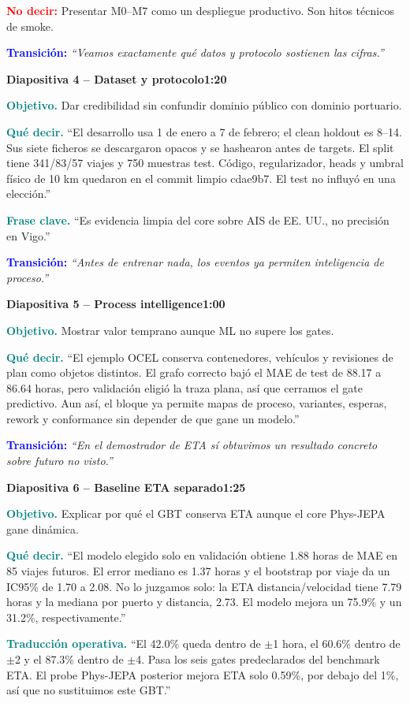 \documentclass[11pt,a4paper]{article}
\newcommand{\slidehead}[3]{%
  \par\vspace{7pt}\noindent
  \colorbox{Ink}{\parbox{\dimexpr\linewidth-2\fboxsep\relax}{%
    \color{white}\textbf{Diapositiva #1 -- #2}\hfill\color{Teal!45}\textbf{#3}}}%
  \par\vspace{5pt}}
\newcommand{\cue}[1]{\textcolor{Teal}{\textbf{#1}}}
\newcommand{\avoid}[1]{\textcolor{Red}{\textbf{No decir:}} #1}
\newcommand{\transition}[1]{\textcolor{Blue}{\textbf{Transición:}} \emph{``#1''}}
\begin{document}
\avoid{Presentar M0--M7 como un despliegue productivo. Son hitos técnicos de smoke.}

\transition{Veamos exactamente qué datos y protocolo sostienen las cifras.}

\slidehead{4}{Dataset y protocolo}{1:20}
\cue{Objetivo.} Dar credibilidad sin confundir dominio público con dominio portuario.

\cue{Qué decir.} ``El desarrollo usa 1 de enero a 7 de febrero; el clean holdout es 8--14.
Sus siete ficheros se descargaron opacos y se hashearon antes de targets. El split tiene
341/83/57 viajes y 750
muestras test. Código, regularizador, heads y umbral físico de 10 km quedaron en el commit
limpio cdae9b7. El test no influyó en una elección.''

\cue{Frase clave.} ``Es evidencia limpia del core sobre AIS de EE. UU., no precisión en Vigo.''

\transition{Antes de entrenar nada, los eventos ya permiten inteligencia de proceso.}

\clearpage
\slidehead{5}{Process intelligence}{1:00}
\cue{Objetivo.} Mostrar valor temprano aunque ML no supere los gates.

\cue{Qué decir.} ``El ejemplo OCEL conserva contenedores, vehículos y revisiones de plan
como objetos distintos. El grafo correcto bajó el MAE de test de 88.17 a
86.64 horas, pero validación eligió la traza plana, así que cerramos el gate
predictivo. Aun así, el bloque ya permite mapas de proceso, variantes, esperas, rework y
conformance sin depender de que gane un modelo.''

\transition{En el demostrador de ETA sí obtuvimos un resultado concreto sobre futuro no visto.}

\slidehead{6}{Baseline ETA separado}{1:25}
\cue{Objetivo.} Explicar por qué el GBT conserva ETA aunque el core Phys-JEPA gane dinámica.

\cue{Qué decir.} ``El modelo elegido solo en validación obtiene 1.88 horas de MAE
en 85 viajes futuros. El error mediano es 1.37 horas y el
bootstrap por viaje da un IC95\% de 1.70 a 2.08. No lo juzgamos solo:
la ETA distancia/velocidad tiene 7.79 horas y la mediana por puerto y distancia,
2.73. El modelo mejora un 75.9\% y un
31.2\%, respectivamente.''

\cue{Traducción operativa.} ``El 42.0\% queda dentro de $\pm$1 hora, el
60.6\% dentro de $\pm$2 y el 87.3\% dentro de $\pm$4. Pasa los seis
gates predeclarados del benchmark ETA. El probe Phys-JEPA posterior mejora ETA solo
0.59\%, por debajo del 1\%, así que no sustituimos este GBT.''
\end{document}
